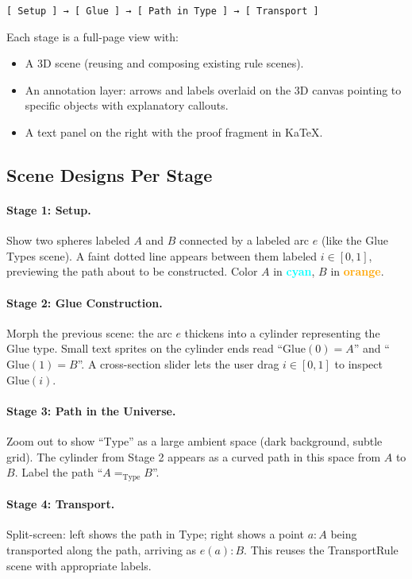 \documentclass[11pt,a4paper]{article}
\begin{document}
\begin{center}
\texttt{[ Setup ] → [ Glue ] → [ Path in Type ] → [ Transport ] }
\end{center}

\noindent Each stage is a full-page view with:
\begin{itemize}
  \item A 3D scene (reusing and composing existing rule scenes).
  \item An annotation layer: arrows and labels overlaid on the 3D canvas
    pointing to specific objects with explanatory callouts.
  \item A text panel on the right with the proof fragment in KaTeX.
\end{itemize}

\subsection{Scene Designs Per Stage}

\paragraph{Stage 1: Setup.}
Show two spheres labeled $A$ and $B$ connected by a labeled arc $e$
(like the Glue Types scene). A faint dotted line appears between them
labeled $i \in [0,1]$, previewing the path about to be constructed.
Color $A$ in \textcolor{cyan}{\textbf{cyan}}, $B$ in \textcolor{orange}{\textbf{orange}}.

\paragraph{Stage 2: Glue Construction.}
Morph the previous scene: the arc $e$ thickens into a cylinder representing
the Glue type. Small text sprites on the cylinder ends read
``$\mathrm{Glue}(0) = A$'' and ``$\mathrm{Glue}(1) = B$''. A cross-section
slider lets the user drag $i \in [0,1]$ to inspect $\mathrm{Glue}(i)$.

\paragraph{Stage 3: Path in the Universe.}
Zoom out to show ``$\mathrm{Type}$'' as a large ambient space (dark background,
subtle grid). The cylinder from Stage 2 appears as a curved path in this space
from $A$ to $B$. Label the path ``$A =_\mathrm{Type} B$''.

\paragraph{Stage 4: Transport.}
Split-screen: left shows the path in Type; right shows a point $a : A$
being transported along the path, arriving as $e(a) : B$.
This reuses the TransportRule scene with appropriate labels.
\end{document}
